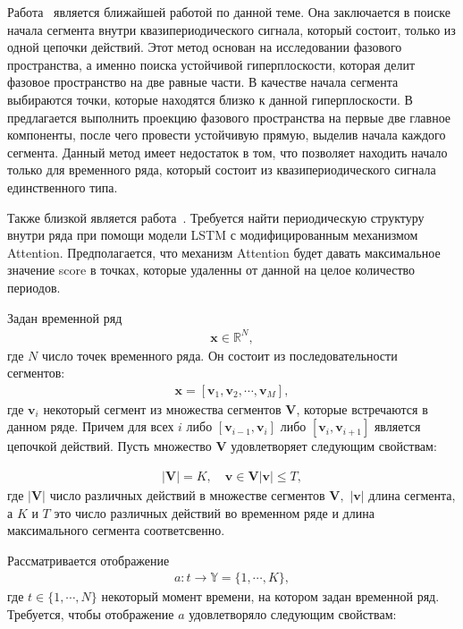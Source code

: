 Работа~\cite{motrenko2015} является ближайшей работой по данной теме. Она заключается в поиске начала сегмента внутри квазипериодического сигнала, который состоит, только из одной цепочки действий. Этот метод основан на исследовании фазового пространства, а именно поиска устойчивой гиперплоскости, которая делит фазовое пространство на две равные части. В качестве начала сегмента выбираются точки, которые находятся близко к данной гиперплоскости. В~\cite{motrenko2015} предлагается выполнить проекцию фазового пространства на первые две главное компоненты, после чего провести устойчивую прямую, выделив начала каждого сегмента. 
Данный метод имеет недостаток в том, что позволяет находить начало только для временного ряда, который состоит из квазипериодического сигнала единственного типа.


Также близкой является работа~\cite{cinar2018}. Требуется найти периодическую структуру внутри ряда при помощи модели LSTM с модифицированным механизмом Attention. Предполагается, что механизм Attention будет давать максимальное значение score в точках, которые удаленны от данной на целое количество периодов.

Задан временной ряд
\[
\label{eq:st:1}
\begin{aligned}
\textbf{x} \in \mathbb{R}^{N},
\end{aligned}
\]
где $N$ число точек временного ряда. Он состоит из последовательности сегментов:
\[
\label{eq:st:2}
\begin{aligned}
\textbf{x} = [\textbf{v}_1, \textbf{v}_2, \cdots, \textbf{v}_M],
\end{aligned}
\]
где $\textbf{v}_i$ некоторый сегмент из множества сегментов $\mathbf{V}$, которые встречаются в данном ряде. 
Причем для всех $i$ либо $[\textbf{v}_{i-1},\textbf{v}_{i}]$ либо $[\textbf{v}_{i},\textbf{v}_{i+1}]$  является цепочкой действий. Пусть множество $\mathbf{V}$ удовлетворяет следующим свойствам:

\[
\label{eq:st:3}
\begin{aligned}
\left|\mathbf{V}\right| = K, \quad \textbf{v} \in \mathbf{V} \left|\textbf{v}\right| \leq T,
\end{aligned}
\]
где $\left|\mathbf{V}\right|$ число различных действий в множестве сегментов $\mathbf{V},$ $\left|\textbf{v}\right|$ длина сегмента, а $K$ и $T$ это число различных действий во временном ряде и длина максимального сегмента соответсвенно.

Рассматривается отображение
\[
\label{eq:st:4}
\begin{aligned}
a : t \to \mathbb{Y} = \{1,\cdots, K\}, 
\end{aligned}
\]
где $t \in \{1,\cdots, N\}$ некоторый момент времени, на котором задан временной ряд.
Требуется, чтобы отображение $a$ удовлетворяло следующим свойствам:

